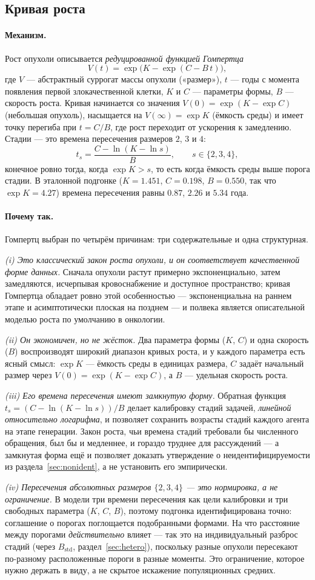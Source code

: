 \documentclass[12pt,a4paper]{article}
\newcommand{\mech}[1]{\paragraph{Механизм.} #1}
\newcommand{\why}[1]{\paragraph{Почему так.} #1}
\begin{document}
\subsection{Кривая роста}

\mech{Рост опухоли описывается \emph{редуцированной функцией Гомпертца}
\[
V(t) = \exp\!\bigl(K - \exp(C - B\,t)\bigr),
\]
где $V$ --- абстрактный суррогат массы опухоли («размер»), $t$ --- годы с момента появления первой
злокачественной клетки, $K$ и $C$ --- параметры формы, $B$ --- скорость роста. Кривая начинается со
значения $V(0) = \exp(K - \exp C)$ (небольшая опухоль), насыщается на $V(\infty) = \exp K$ (ёмкость среды) и
имеет точку перегиба при $t = C/B$, где рост переходит от ускорения к замедлению. Стадии --- это времена
пересечения размеров $2$, $3$ и $4$:
\[
t_s = \frac{C - \ln(K - \ln s)}{B}, \qquad s \in \{2,3,4\},
\]
конечное ровно тогда, когда $\exp K > s$, то есть когда ёмкость среды выше порога стадии. В эталонной
подгонке ($K = 1.451$, $C = 0.198$, $B = 0.550$, так что $\exp K = 4.27$) времена пересечения равны
$0.87$, $2.26$ и $5.34$ года.}

\why{Гомпертц выбран по четырём причинам: три содержательные и одна структурная.

\emph{(i) Это классический закон роста опухоли, и он соответствует качественной форме данных.} Сначала
опухоли растут примерно экспоненциально, затем замедляются, исчерпывая кровоснабжение и доступное
пространство; кривая Гомпертца обладает ровно этой особенностью --- экспоненциальна на раннем этапе и
асимптотически плоская на позднем --- и полвека является описательной моделью роста по умолчанию в
онкологии.

\emph{(ii) Он экономичен, но не жёсток.} Два параметра формы ($K$, $C$) и одна скорость ($B$) воспроизводят
широкий диапазон кривых роста, и у каждого параметра есть ясный смысл: $\exp K$ --- ёмкость среды в
единицах размера, $C$ задаёт начальный размер через $V(0) = \exp(K - \exp C)$, а $B$ --- удельная скорость
роста.

\emph{(iii) Его времена пересечения имеют замкнутую форму.} Обратная функция
$t_s = (C - \ln(K - \ln s))/B$ делает калибровку стадий задачей, \emph{линейной относительно логарифма}, и
позволяет сохранить возрасты стадий каждого агента на этапе генерации. Закон роста, чьи времена стадий
требовали бы численного обращения, был бы и медленнее, и гораздо труднее для рассуждений --- а замкнутая
форма ещё и позволяет доказать утверждение о неидентифицируемости из раздела~\ref{sec:nonident}, а не
установить его эмпирически.

\emph{(iv) Пересечения абсолютных размеров $\{2,3,4\}$ --- это нормировка, а не ограничение.} В модели три
времени пересечения как цели калибровки и три свободных параметра ($K$, $C$, $B$), поэтому подгонка
идентифицирована точно: соглашение о порогах поглощается подобранными формами. На что расстояние между
порогами \emph{действительно} влияет --- так это на индивидуальный разброс стадий (через
$B_{\text{std}}$, раздел~\ref{sec:hetero}), поскольку разные опухоли пересекают по-разному расположенные
пороги в разные моменты. Это ограничение, которое нужно держать в виду, а не скрытое искажение
популяционных средних.}
\end{document}
